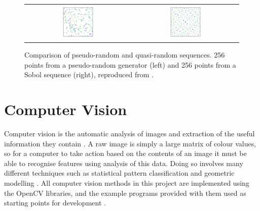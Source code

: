 \begin{figure}[H]
    \begin{center}
    \begin{tabular}{ c c }
        \includegraphics[width=0.33\textwidth]{Figures/Pseudorandom_sequence_2D.png} &
        \includegraphics[width=0.33\textwidth]{Figures/Sobol_sequence_2D.png}
    \end{tabular}
    \caption[Comparison of pseudo-random and quasi-random sequences]{Comparison of pseudo-random and quasi-random sequences. 256 points from a pseudo-random generator (left) and 256 points from a Sobol sequence (right), reproduced from \cite{SobolWiki}.}
    \label{fig:Sobol}
    \end{center}
\end{figure}

\section{Computer Vision}

Computer vision is the automatic analysis of images and extraction of the useful information they contain \cite{CVDef}. A raw image is simply a large matrix of colour values, so for a computer to take action based on the contents of an image it must be able to recognise features using analysis of this data. Doing so involves many different techniques such as statistical pattern classification and geometric modelling \cite{ballard1982computer}. All computer vision methods in this project are implemented using the OpenCV libraries, and the example programs provided with them used as starting points for development \cite{OpenCV}.

